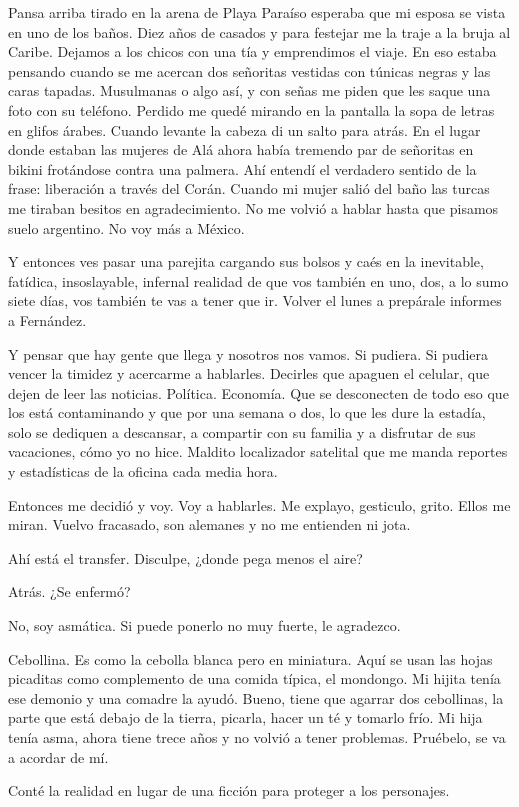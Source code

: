 \documentclass[11pt,twoside,openright,a6paper]{book}
\begin{document}
\vspace{1.5cm}
Pansa arriba tirado en la arena de Playa Paraíso esperaba que mi esposa se vista en uno de los baños. Diez años de casados y para festejar me la traje a la bruja al Caribe. Dejamos a los chicos con una tía y emprendimos el viaje. En eso estaba pensando cuando se me acercan dos señoritas vestidas con túnicas negras y las caras tapadas. Musulmanas o algo así, y con señas me piden que les saque una foto con su teléfono. Perdido me quedé mirando en la pantalla la sopa de letras en glifos árabes. Cuando levante la cabeza di un salto para atrás. En el lugar donde estaban las mujeres de Alá ahora había tremendo par de señoritas en bikini frotándose contra una palmera. Ahí entendí el verdadero sentido de la frase: liberación a través del Corán. Cuando mi mujer salió del baño las turcas me tiraban besitos en agradecimiento. No me volvió a hablar hasta que pisamos suelo argentino. No voy más a México.


\vspace{1.5cm}
Y entonces ves pasar una parejita cargando sus bolsos y caés en la inevitable, fatídica, insoslayable, infernal realidad de que vos también en uno, dos, a lo sumo siete días, vos también te vas a tener que ir. Volver el lunes a prepárale informes a Fernández.


\vspace{1.5cm}
Y pensar que hay gente que llega y nosotros nos vamos. Si pudiera. Si pudiera vencer la timidez y acercarme a hablarles. Decirles que apaguen el celular, que dejen de leer las noticias. Política. Economía. Que se desconecten de todo eso que los está contaminando y que por una semana o dos, lo que les dure la estadía, solo se dediquen a descansar, a compartir con su familia y a disfrutar de sus vacaciones, cómo yo no hice. Maldito localizador satelital que me manda reportes y estadísticas de la oficina cada media hora. 

Entonces me decidió y voy. Voy a hablarles. Me explayo, gesticulo, grito. Ellos me miran. Vuelvo fracasado, son alemanes y no me entienden ni jota.


\vspace{1.5cm}
Ahí está el transfer. Disculpe, ¿donde pega menos el aire?

Atrás. ¿Se enfermó?

No, soy asmática. Si puede ponerlo no muy fuerte, le agradezco.

Cebollina. Es como la cebolla blanca pero en miniatura. Aquí se usan las hojas picaditas como complemento de una comida típica, el mondongo. Mi hijita tenía ese demonio y una comadre la ayudó. Bueno, tiene que agarrar dos cebollinas, la parte que está debajo de la tierra, picarla, hacer un té y tomarlo frío. Mi hija tenía asma, ahora tiene trece años y no volvió a tener problemas. Pruébelo, se va a acordar de mí.


\vspace{1.5cm}
Conté la realidad en lugar de una ficción para proteger a los personajes.
\end{document}

